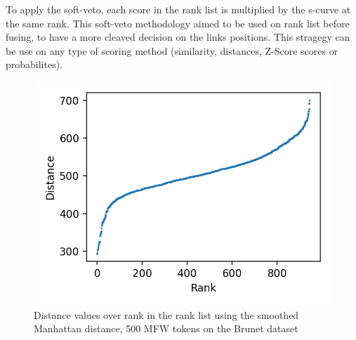 To apply the soft-veto, each score in the rank list is multiplied by the s-curve at the same rank.
This soft-veto methodology aimed to be used on rank list before fusing, to have a more cleaved decision on the links positions.
This stragegy can be use on any type of scoring method (similarity, distances, Z-Score scores or probabilites).

\begin{figure}
  \centering
  \caption{Distance values over rank in the rank list using the smoothed Manhattan distance, 500 MFW tokens on the Brunet dataset}
  \label{fig:distance_over_rank}
  \includegraphics[width=\linewidth]{img/distance_over_rank.png}
\end{figure}

